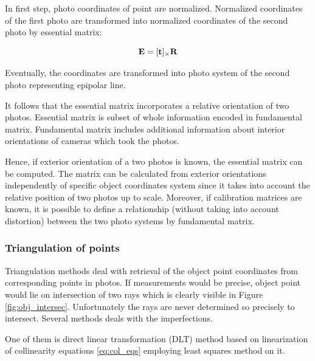 \documentclass[a4paper,12pt]{article}
\newcommand{\ematr}[1]{%
{\bf #1}%
}
\newcommand{\evect}[1]{%
{\bf #1}%
}
\begin{document}
In first step, photo coordinates of point are normalized.
Normalized coordinates of the first photo are transformed 
into normalized coordinates of the second photo by essential matrix:

\begin{equation}
	 \ematr{E}  = [\evect{t}]_{\times} \ematr{R}
\end{equation}

Eventually, the coordinates are transformed into photo system of the second photo
representing epipolar line.     

It follows that the essential matrix incorporates a relative orientation of two photos.
Essential matrix is subset of whole information encoded in fundamental matrix.
Fundamental matrix includes
additional information about interior orientations of cameras which took the photos.  

Hence, if exterior orientation of a two photos is known, the
essential matrix can be computed. The matrix can be calculated from exterior orientations 
independently of specific object coordinates system since it takes into account the relative 
position of two photos up to scale. Moreover, if calibration matrices 
are known, it is possible to define a relationship (without taking into account distortion) between 
 the two photo systems by fundamental matrix.

\subsubsection{Triangulation of points}
\label{sec:triang}

Triangulation methods deal with retrieval of the object point coordinates
from corresponding points in photos. 
If measurements would be precise, object point 
would lie on intersection of two rays which is clearly visible in 
 Figure \ref{fig:obj_intersec}. Unfortunately the rays are never determined so precisely to intersect.
 Several methods deals with the imperfections.

One of them is direct linear transformation (DLT) method based 
on linearization of collinearity equations \eqref{eq:col_eqs}
employing least squares method on it.
\end{document}
